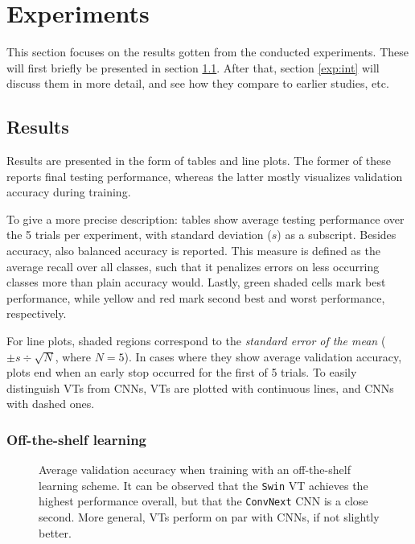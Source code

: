 \section{Experiments}
This section focuses on the results gotten from the conducted experiments. These will first briefly be presented in section \ref{results}. After that, section \ref{exp:int} will discuss them in more detail, and see how they compare to earlier studies, etc.

\subsection{Results} \label{results}
Results are presented in the form of tables and line plots. The former of these reports final testing performance, whereas the latter mostly visualizes validation accuracy during training.

To give a more precise description: tables show average testing performance over the 5 trials per experiment, with standard deviation ($s$) as a subscript. Besides accuracy, also balanced accuracy is reported. This measure is defined as the average recall over all classes, such that it penalizes errors on less occurring classes more than plain accuracy would. Lastly, green shaded cells mark best performance, while yellow and red mark second best and worst performance, respectively.

For line plots, shaded regions correspond to the \textit{standard error of the mean} ($\pm s \div \sqrt{N}$, where $N=5$). In cases where they show average validation accuracy, plots end when an early stop occurred for the first of 5 trials. To easily distinguish VTs from CNNs, VTs are plotted with continuous lines, and CNNs with dashed ones.

\subsubsection{Off-the-shelf learning} \label{results:ots}

\begin{figure}[tb]
    \centering
    \def\svgwidth{\textwidth}
    
    \caption{Average validation accuracy when training with an off-the-shelf learning scheme. It can be observed that the \texttt{Swin} VT achieves the highest performance overall, but that the \texttt{ConvNext} CNN is a close second. More general, VTs perform on par with CNNs, if not slightly better.}
    \label{results:img:ots}
\end{figure}

